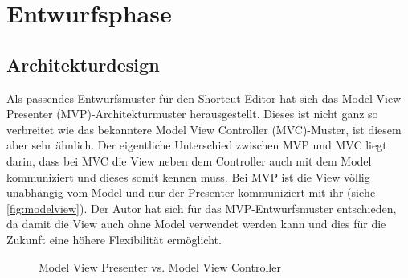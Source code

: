 \section{Entwurfsphase}

\subsection{Architekturdesign}
\label{Architekturdesign}

Als passendes Entwurfsmuster für den Shortcut Editor hat sich das Model View Presenter (MVP)-Architekturmuster herausgestellt. Dieses ist nicht ganz so verbreitet wie das bekanntere Model View Controller (MVC)-Muster, ist diesem aber sehr ähnlich. Der eigentliche Unterschied zwischen MVP und MVC liegt darin, dass bei MVC die View neben dem Controller auch mit dem Model kommuniziert und dieses somit kennen muss. Bei MVP ist die View völlig unabhängig vom Model und nur der Presenter kommuniziert mit ihr (siehe \autoref{fig:modelview}). Der Autor hat sich für das MVP-Entwurfsmuster entschieden, da damit die View auch ohne Model verwendet werden kann und dies für die Zukunft eine höhere Flexibilität ermöglicht.

\begin{figure}[H] 
	\hfill 
	\caption{Model View Presenter vs. Model View Controller} 
	\label{fig:modelview}
\end{figure}

